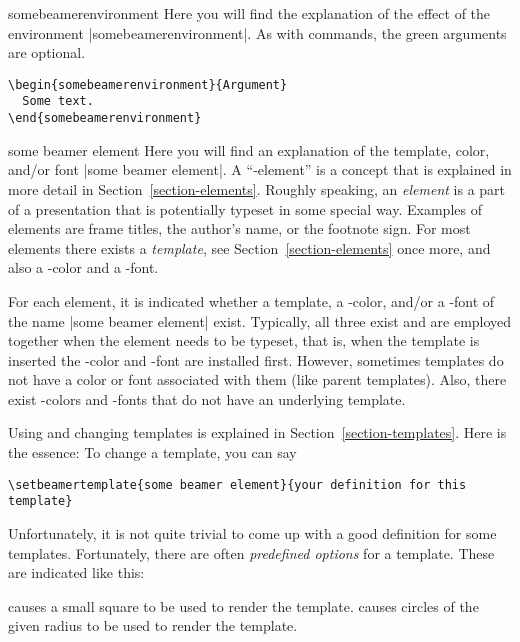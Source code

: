 \begin{environment}{{somebeamerenvironment}}
  Here you will find the explanation of the effect of the environment |somebeamerenvironment|. As with commands, the green arguments are optional.

  \example
\begin{verbatim}
\begin{somebeamerenvironment}{Argument}
  Some text.
\end{somebeamerenvironment}
\end{verbatim}
\end{environment}

\begin{element}{some beamer element}\yes\yes\yes
  Here you will find an explanation of the template, color, and/or font |some beamer element|. A ``\beamer-element'' is a concept that is explained in more detail in Section~\ref{section-elements}. Roughly speaking, an \emph{element} is a part of a presentation that is potentially typeset in some special way. Examples of elements are frame titles, the author's name, or the footnote sign. For most elements there exists a \emph{template}, see Section~\ref{section-elements} once more, and also a \beamer-color and a \beamer-font.

  For each element, it is indicated whether a template, a \beamer-color, and/or a \beamer-font of the name |some beamer element| exist. Typically, all three exist and are employed together when the element needs to be typeset, that is, when the template is inserted the \beamer-color and -font are installed first. However, sometimes templates do not have a color or font associated with them (like parent templates). Also, there exist \beamer-colors and -fonts that do not have an underlying template.

  Using and changing templates is explained in Section~\ref{section-templates}. Here is the essence: To change a template, you can say
\begin{verbatim}
\setbeamertemplate{some beamer element}{your definition for this template}
\end{verbatim}

  Unfortunately, it is not quite trivial to come up with a good definition for some templates. Fortunately, there are often \emph{predefined options} for a template. These are indicated like this:
  \begin{itemize}
    causes a small square to be used to render the template.
    causes circles of the given radius to be used to render the template.
  \end{itemize}


\end{element}
